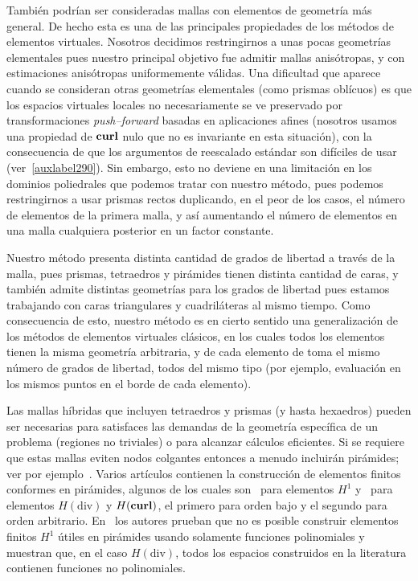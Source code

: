 También podrían ser consideradas mallas con elementos
de geometría más general. De hecho esta es una 
de las principales propiedades de los métodos
de elementos virtuales. Nosotros decidimos
restringirnos a unas pocas geometrías elementales
pues nuestro principal objetivo fue admitir 
mallas anisótropas, y con estimaciones anisótropas
uniformemente válidas. Una dificultad que aparece
cuando se consideran otras geometrías elementales 
(como prismas oblícuos) es que los espacios virtuales
locales no necesariamente se ve preservado 
por transformaciones \emph{push--forward} basadas 
en aplicaciones afines (nosotros 
usamos una propiedad de $\textbf{curl}$ nulo que no
es invariante en esta situación), con
la consecuencia de que los argumentos de
reescalado estándar son difíciles de usar
(ver~\ref{auxlabel290}). Sin embargo, esto no deviene
en una limitación en los dominios poliedrales que
podemos tratar con nuestro método, pues podemos
restringirnos a usar prismas rectos duplicando, en el
peor de los casos, el número de elementos de la
primera malla, y así aumentando el número de elementos
en una malla cualquiera posterior en un factor constante.

Nuestro método presenta distinta cantidad de grados
de libertad a través de la malla, pues prismas, tetraedros
y pirámides tienen distinta cantidad de caras, y también
admite distintas geometrías para los grados de libertad pues
estamos trabajando con caras triangulares y cuadriláteras
al mismo tiempo. Como consecuencia de esto, nuestro método
es en cierto sentido una generalización de los
métodos de elementos virtuales clásicos, en los cuales todos
los elementos tienen la misma geometría arbitraria, y de 
cada elemento de toma el mismo número de grados de libertad, todos
del mismo tipo (por ejemplo, evaluación en los mismos puntos en
el borde de cada elemento).

Las mallas híbridas que incluyen tetraedros y prismas (y hasta
hexaedros) pueden ser necesarias para satisfaces las demandas
de la geometría específica de un problema (regiones no triviales)
o para alcanzar cálculos eficientes. Si se requiere que estas mallas
eviten nodos colgantes entonces a menudo incluirán pirámides; ver
por ejemplo~\cite{owenSaigal}. Varios art\'iculos contienen
la construcción de elementos finitos conformes en pirámides,
algunos de los cuales son~\cite{bergot} 
para elementos $H^1$ y~\cite{gh99, Nigam-2012}
para elementos $H(\mbox{div})$ y $H({\bf curl})$,
el primero para orden bajo y el segundo para orden arbitrario.
En~\cite{Nigam-2012} los autores prueban que no es posible
construir elementos finitos $H^1$ útiles en pirámides
usando solamente funciones polinomiales y muestran que, 
en el caso $H(\mbox{div})$,
todos los espacios construidos en la literatura contienen
funciones no polinomiales.

